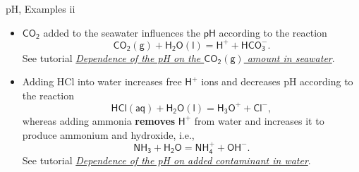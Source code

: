 %
\begin{frame}{pH, Examples \; ii}
\footnotesize
\lcol

\begin{itemize}
\item $\mathsf{CO_2}$ added to the seawater influences the $\mathsf{pH}$ according to the reaction
%
\[
\mathsf{CO_2(g) + H_2O(l) = H^+ + HCO_3^-.}
\]
% 
See tutorial \href{https://reaktoro.org/applications/miscellaneous/ph-dependence-on-co2-addition-in-seawater.html}{\textcolor{indigo(dye)}{\it Dependence of the pH on the $\mathsf{CO_2(g)}$ amount in seawater}}.
%
\pause
\vskip 10pt
\pause
\item Adding HCl into water increases free $\mathsf{H^+}$ ions and decreases pH according to the reaction 
%
\[
\mathsf{HCl(aq) + H_2O(l) = H_3O^+ + Cl^-,}
\]
%
whereas 
%
%
adding ammonia \textbf{removes} $\mathsf{H^+}$ from water and increases it to produce ammonium and hydroxide, i.e., 
%
\[
\mathsf{NH_3 + H_2O = NH_4^+ + OH^-.}
\]
%
%
% 
See tutorial \href{https://reaktoro.org/applications/miscellaneous/ph-dependence-on-contaminants-in-water.html}{\textcolor{indigo(dye)}{\it Dependence of the pH on added contaminant in water}}.


\end{itemize}
\end{frame}
